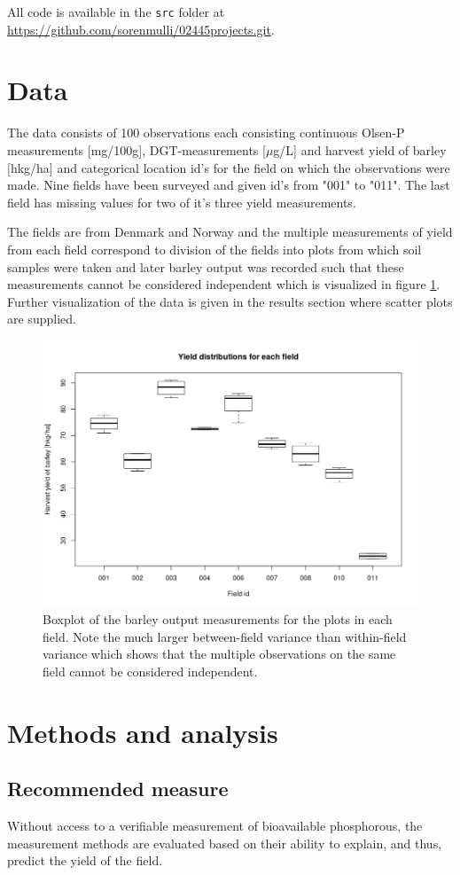 \documentclass[11pt,fleqn]{article}
\begin{document}
All code is available in the \texttt{src} folder at \url{https://github.com/sorenmulli/02445projects.git}.

\section{Data}
The data consists of 100 observations each consisting continuous  Olsen-P measurements [mg/100g], DGT-measurements [\(\mu\)g/L] and harvest yield of barley [hkg/ha] and categorical location id's for the field on which the observations were made. Nine fields have been surveyed and given id's from "001" to "011". The last field has missing values for two of it's three yield measurements.  

The fields are from Denmark and Norway and the multiple measurements of yield from each field correspond to division of the fields into plots from which soil samples were taken and later barley output was recorded such that these measurements cannot be considered independent which is visualized in figure \ref{fig:fieldbox}. Further visualization of the data is given in the results section where scatter plots are supplied.
\begin{figure}[H]
	\centering
	\includegraphics[width=.7\linewidth]{p2_fieldbox}
	\caption{Boxplot of the barley output measurements for the plots in each field. Note the much larger between-field variance than within-field variance which shows that the multiple observations on the same field cannot be considered independent.}
	\label{fig:fieldbox}
\end{figure}
\section{Methods and analysis}
\subsection{Recommended measure}
Without access to a verifiable measurement of bioavailable phosphorous, the measurement methods are evaluated based on their ability to explain, and thus, predict the yield of the field. 
\end{document}
